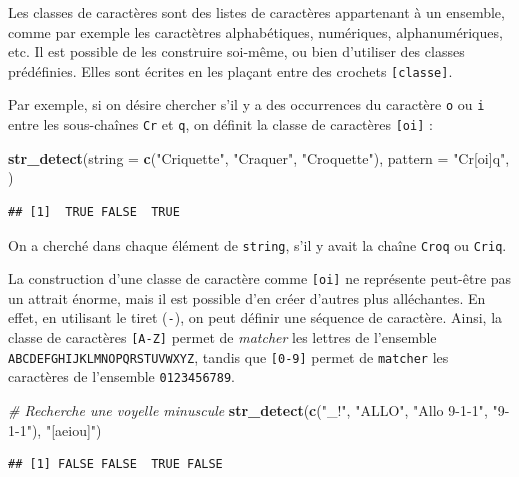 \documentclass[
  11pt,
]{book}
\newenvironment{Shaded}{\begin{snugshade}}{\end{snugshade}}
\newcommand{\CommentTok}[1]{\textcolor[rgb]{0.56,0.35,0.01}{\textit{#1}}}
\newcommand{\DataTypeTok}[1]{\textcolor[rgb]{0.13,0.29,0.53}{#1}}
\newcommand{\KeywordTok}[1]{\textcolor[rgb]{0.13,0.29,0.53}{\textbf{#1}}}
\newcommand{\NormalTok}[1]{#1}
\newcommand{\StringTok}[1]{\textcolor[rgb]{0.31,0.60,0.02}{#1}}
\numberwithin{equation}{section}
\numberwithin{countremarque}{section}
\begin{document}
Les classes de caractères sont des listes de caractères appartenant à un ensemble, comme par exemple les caractètres alphabétiques, numériques, alphanumériques, etc. Il est possible de les construire soi-même, ou bien d'utiliser des classes prédéfinies. Elles sont écrites en les plaçant entre des crochets \texttt{{[}classe{]}}.

Par exemple, si on désire chercher s'il y a des occurrences du caractère \texttt{o} ou \texttt{i} entre les sous-chaînes \texttt{Cr} et \texttt{q}, on définit la classe de caractères \texttt{{[}oi{]}} :

\begin{Shaded}
\begin{Highlighting}[]
\KeywordTok{str\_detect}\NormalTok{(}\DataTypeTok{string =} \KeywordTok{c}\NormalTok{(}\StringTok{"Criquette"}\NormalTok{, }\StringTok{"Craquer"}\NormalTok{, }\StringTok{"Croquette"}\NormalTok{),}
           \DataTypeTok{pattern =} \StringTok{"Cr[oi]q"}\NormalTok{, )}
\end{Highlighting}
\end{Shaded}

\begin{lstlisting}
## [1]  TRUE FALSE  TRUE
\end{lstlisting}

On a cherché dans chaque élément de \texttt{string}, s'il y avait la chaîne \texttt{Croq} ou \texttt{Criq}.

La construction d'une classe de caractère comme \texttt{{[}oi{]}} ne représente peut-être pas un attrait énorme, mais il est possible d'en créer d'autres plus alléchantes. En effet, en utilisant le tiret (\texttt{-}), on peut définir une séquence de caractère. Ainsi, la classe de caractères \texttt{{[}A-Z{]}} permet de \emph{matcher} les lettres de l'ensemble \texttt{ABCDEFGHIJKLMNOPQRSTUVWXYZ}, tandis que \texttt{{[}0-9{]}} permet de \texttt{matcher} les caractères de l'ensemble \texttt{0123456789}.

\begin{Shaded}
\begin{Highlighting}[]
\CommentTok{\# Recherche une voyelle minuscule}
\KeywordTok{str\_detect}\NormalTok{(}\KeywordTok{c}\NormalTok{(}\StringTok{"\_!"}\NormalTok{, }\StringTok{"ALLO"}\NormalTok{, }\StringTok{"Allo 9{-}1{-}1"}\NormalTok{, }\StringTok{"9{-}1{-}1"}\NormalTok{), }\StringTok{"[aeiou]"}\NormalTok{)}
\end{Highlighting}
\end{Shaded}

\begin{lstlisting}
## [1] FALSE FALSE  TRUE FALSE
\end{lstlisting}
\end{document}
